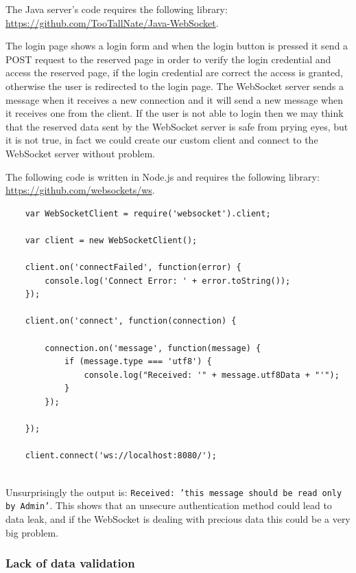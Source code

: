 	The Java server's code requires the following library: \url{https://github.com/TooTallNate/Java-WebSocket}.\newline
	
	The login page shows a login form and when the login button is pressed it send a POST request to the reserved page in order to verify the login credential and access the reserved page, if the login credential are correct the access is granted, otherwise the user is redirected to the login page.\newline
	The WebSocket server sends a message when it receives a new connection and it will send a new message when it receives one from the client.\newline
	If the user is not able to login then we may think that the reserved data sent by the WebSocket server is safe from prying eyes, but it is not true, in fact we could create our custom client and connect to the WebSocket server without problem.\newline
	
	The following code is written in Node.js and requires the following library: \url{https://github.com/websockets/ws}.\newline
	
	\begin{lstlisting}
	var WebSocketClient = require('websocket').client;
	
	var client = new WebSocketClient();
	
	client.on('connectFailed', function(error) {
		console.log('Connect Error: ' + error.toString());
	});
	
	client.on('connect', function(connection) {
		
		connection.on('message', function(message) {
			if (message.type === 'utf8') {
				console.log("Received: '" + message.utf8Data + "'");
			}
		});
		
	});
	
	client.connect('ws://localhost:8080/');
	
	\end{lstlisting}
	
	Unsurprisingly the output is:
	\texttt{Received: 'this message should be read only by Admin'}.\newline
	This shows that an unsecure authentication method could lead to data leak, and if the WebSocket is dealing with precious data this could be a very big problem.\newline
	
	\subsubsection{Lack of data validation}
	
